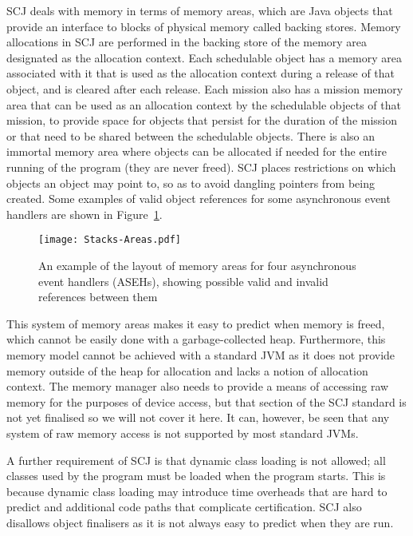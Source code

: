 \documentclass[a4paper,10pt]{report}
\begin{document}
SCJ deals with memory in terms of memory areas, which are Java objects that
provide an interface to blocks of physical memory called backing stores.  Memory
allocations in SCJ are performed in the backing store of the memory area
designated as the allocation context.  Each schedulable object has a memory area
associated with it that is used as the allocation context during a release of
that object, and is cleared after each release.  Each mission also has a mission
memory area that can be used as an allocation context by the schedulable objects
of that mission, to provide space for objects that persist for the duration of
the mission or that need to be shared between the schedulable objects.  There is
also an immortal memory area where objects can be allocated if needed for the
entire running of the program (they are never freed). SCJ places restrictions on
which objects an object may point to, so as to avoid dangling pointers from
being created. Some examples of valid object references for some asynchronous
event handlers are shown in Figure~\ref{stacks-areas-diagram}.


\begin{figure}[ht]
\texttt{[image: Stacks-Areas.pdf]}
\caption{An example of the layout of memory areas for four asynchronous event
  handlers (ASEHs), showing possible valid and invalid references between them}
\label{stacks-areas-diagram}
\end{figure}

This system of memory areas makes it easy to predict when memory is freed, which
cannot be easily done with a garbage-collected heap.  Furthermore, this memory
model cannot be achieved with a standard JVM as it does not provide memory
outside of the heap for allocation and lacks a notion of allocation context. The
memory manager also needs to provide a means of accessing raw memory for the
purposes of device access, but that section of the SCJ standard is not yet
finalised so we will not cover it here. It can, however, be seen that any system
of raw memory access is not supported by most standard JVMs.

A further requirement of SCJ is that dynamic class loading is not allowed; all
classes used by the program must be loaded when the program starts. This is
because dynamic class loading may introduce time overheads that are hard to
predict and additional code paths that complicate certification.  SCJ also
disallows object finalisers as it is not always easy to predict when they are
run.
\end{document}
